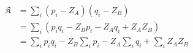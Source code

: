 \begin{equation}
\begin{split}
  \mathfrak{K} & = \sum_{i}^{} (p_i - Z_A) (q_i - Z_B) \\
               & = \sum_{i}^{} (p_i q_i - Z_B p_i - Z_A q_i + Z_A Z_B) \\
               & = \sum_{i}^{} p_i q_i - Z_B \sum_{i}^{} p_i - Z_A \sum_{i}^{} q_i + \sum_{i} Z_A Z_B
\end{split}
\end{equation}


\clearpage %
